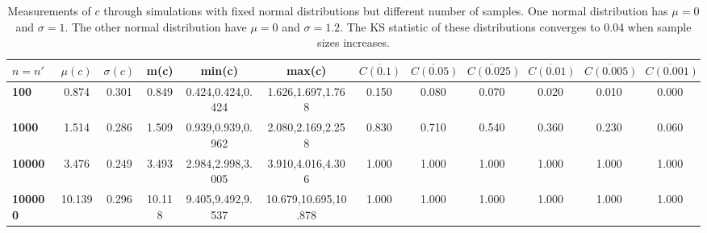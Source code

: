 \begin{table*}[h!]
\vspace{-.3cm}
\begin{center}
\begin{tabular}{| l | c | c | c | c | c | c | c | c | c | c | c |}\hline
$n=n'$ & $\mu(c)$ & $\sigma(c)$ & m(c) & min(c) & max(c) & $\overline{C(0.1)}$ & $\overline{C(0.05)}$ & $\overline{C(0.025)}$ & $\overline{C(0.01)}$ & $\overline{C(0.005)}$ & $\overline{C(0.001)}$ \\\hline\hline
{\bf 100} & 0.874 & 0.301 & 0.849 & 0.424,0.424,0.424 & 1.626,1.697,1.768 & 0.150 & 0.080 & 0.070 & 0.020 & 0.010 & 0.000 \\\hline
{\bf 1000} & 1.514 & 0.286 & 1.509 & 0.939,0.939,0.962 & 2.080,2.169,2.258 & 0.830 & 0.710 & 0.540 & 0.360 & 0.230 & 0.060 \\\hline
{\bf 10000} & 3.476 & 0.249 & 3.493 & 2.984,2.998,3.005 & 3.910,4.016,4.306 & 1.000 & 1.000 & 1.000 & 1.000 & 1.000 & 1.000 \\\hline
{\bf 100000} & 10.139 & 0.296 & 10.118 & 9.405,9.492,9.537 & 10.679,10.695,10.878 & 1.000 & 1.000 & 1.000 & 1.000 & 1.000 & 1.000 \\\hline
\end{tabular}
\caption{Measurements of $c$ through simulations
        with fixed normal distributions but different number of samples.
        One normal distribution has $\mu=0$ and $\sigma=1$.
        The other normal distribution have
        $\mu=0$ and $\sigma=1.2$.
        The KS statistic of these distributions converges
        to 0.04 when sample sizes increases.}
\end{center}
\end{table*}
